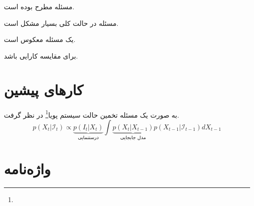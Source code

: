 \documentclass[11pt]{article}
\begin{document}


مسئله مطرح بوده است.

مسئله در حالت کلی بسیار مشکل است.


یک مسئله معکوس است. 

برای مقایسه کارایی باشد.


\section{کارهای پیشین}\label{sec2}
به صورت یک مسئله تخمین حالت  سیستم پویا\footnote{} در نظر گرفت.
\begin{equation}\label{equ:bayes}
p(X_t|\mathcal{I}_t) \propto  \underbrace{p(I_t|X_t)}_\text{درستنمایی}  \int{ \underbrace{p(X_t|X_{t-1})}_\text{مدل جابجایی} p(X_{t-1}|\mathcal{I}_{t-1}) dX_{t-1}}
\end{equation}

\linespread{1}
\small
\setlength{\parskip}{0pt}
\setlength{\parsep}{0pt}

\renewcommand{\bibname}{مراجع}
\begin{latin}

%

\end{latin}



\section*{واژه‌نامه}
\begin{multicols}{3}
\theendnotes 
\end{multicols}
\end{document}
